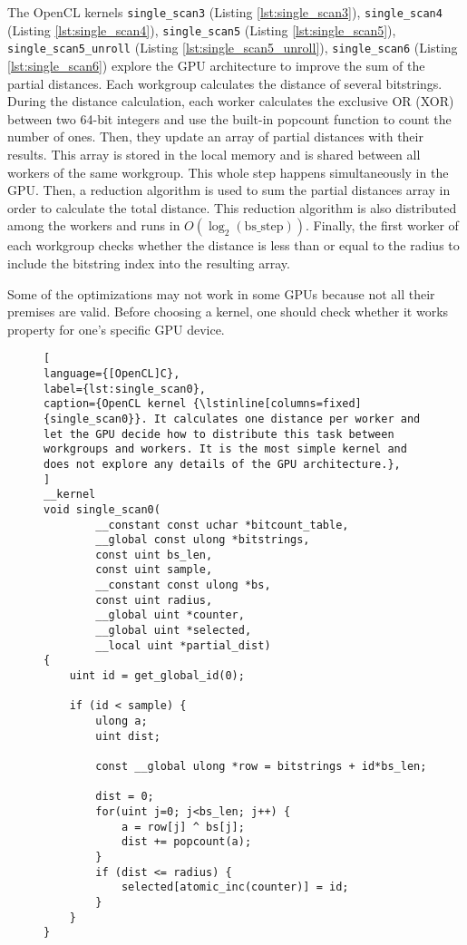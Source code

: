 The OpenCL kernels \lstinline{single_scan3} (Listing \ref{lst:single_scan3}), \lstinline{single_scan4} (Listing \ref{lst:single_scan4}), \lstinline{single_scan5} (Listing \ref{lst:single_scan5}), \lstinline{single_scan5_unroll} (Listing \ref{lst:single_scan5_unroll}), \lstinline{single_scan6} (Listing \ref{lst:single_scan6}) explore the GPU architecture to improve the sum of the partial distances. Each workgroup calculates the distance of several bitstrings. During the distance calculation, each worker calculates the exclusive OR (XOR) between two 64-bit integers and use the built-in popcount function to count the number of ones. Then, they update an array of partial distances with their results. This array is stored in the local memory and is shared between all workers of the same workgroup. This whole step happens simultaneously in the GPU. Then, a reduction algorithm is used to sum the partial distances array in order to calculate the total distance. This reduction algorithm is also distributed among the workers and runs in $O(\log_2(\text{bs\_step}))$. Finally, the first worker of each workgroup checks whether the distance is less than or equal to the radius to include the bitstring index into the resulting array.

Some of the optimizations may not work in some GPUs because not all their premises are valid. Before choosing a kernel, one should check whether it works property for one's specific GPU device.


\begin{figure}[!p]
\begin{lstlisting}[
language={[OpenCL]C},
label={lst:single_scan0},
caption={OpenCL kernel {\lstinline[columns=fixed]{single_scan0}}. It calculates one distance per worker and let the GPU decide how to distribute this task between workgroups and workers. It is the most simple kernel and does not explore any details of the GPU architecture.},
]
__kernel
void single_scan0(
		__constant const uchar *bitcount_table,
		__global const ulong *bitstrings,
		const uint bs_len,
		const uint sample,
		__constant const ulong *bs,
		const uint radius,
		__global uint *counter,
		__global uint *selected,
		__local uint *partial_dist)
{
	uint id = get_global_id(0);

	if (id < sample) {
		ulong a;
		uint dist;

		const __global ulong *row = bitstrings + id*bs_len;

		dist = 0;
		for(uint j=0; j<bs_len; j++) {
			a = row[j] ^ bs[j];
			dist += popcount(a);
		}
		if (dist <= radius) {
			selected[atomic_inc(counter)] = id;
		}
	}
}
\end{lstlisting}
\end{figure}


